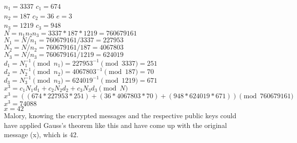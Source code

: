 \documentclass{article}
\begin{document}
\noindent $n_1 = 3337$ \hspace{1in} $c_1 = 674$\\
$n_2 = 187$ \hspace{1.1in} $c_2 = 36$ \hspace{1in} $e = 3$\\
$n_3 = 1219$ \hspace{1in} $c_3 = 948$\\
$N = n_1n_2n_3 = 3337*187*1219 = 760679161$\\
$N_1 = N/n_1 = 760679161/3337 = 227953$\\
$N_2 = N/n_2 = 760679161/187 = 4067803$\\
$N_3 = N/n_3 = 760679161/1219 = 624019$\\
$d_1 = N_1^{-1} \pmod{n_1} = 227953^{-1} \pmod{3337} = 251$\\
$d_2 = N_2^{-1} \pmod{n_2} = 4067803^{-1} \pmod{187} = 70$\\
$d_3 = N_3^{-1} \pmod{n_3} = 624019^{-1} \pmod{1219} = 671$\\
$x^{3} = c_1N_1d_1 + c_2N_2d_2 + c_3N_3d_3 \pmod {N}$\\
$x^{3} = ((674*227953*251)+(36*4067803*70)+(948*624019*671))\pmod{760679161}$\\
$x^{3} = 74088$\\
$x = 42$\\

\noindent Malory, knowing the encrypted messages and the respective public keys could have
applied Gauss's theorem like this and have come up with the original message (x), which is 42.
\end{document}
